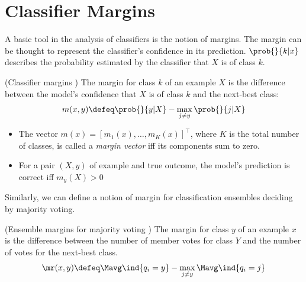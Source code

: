 \documentclass[
    a4paper, %
	fontsize=10pt, %
	twoside=false, %
]{kaobook}
\begin{document}
\section{Classifier Margins}

A basic tool in the analysis of classifiers is the notion of margins.  The margin can be thought to represent the classifier's confidence in its prediction. $\prob{}{k|x}$ describes the probability estimated by the classifier that $X$ is of class $k$.

\begin{definition} (Classifier margins \cite{tibshirani_ElementsStatisticalLearning_2017}) The margin for class $k$ of an example $X$ is the difference between the model's confidence that $X$ is of class $k$ and the next-best class:
$$
m(x,y) \defeq \prob{}{y|X} - \max_{j\not=y} \prob{}{j|X}
$$
\begin{itemize}
    \item The vector $m(x) = [m_{1}(x), \dots, m_{K}(x)]^\top$, where $K$ is the total number of classes, is called a \textit{margin vector} iff its components sum to zero. 
    \item For a pair $(X,y)$ of example and true outcome, the model's prediction is correct iff $m_y(X) > 0$ 
\end{itemize}
\label{def:classifier-margin}
\end{definition}

Similarly, we can define a notion of margin for classification ensembles deciding by majority voting. 

\begin{definition} (Ensemble margins for majority voting \cite{breiman})
The margin for class $y$ of an example $x$ is the difference between the number of member votes for class $Y$ and the number of votes for the next-best class.
	$$
\mr(x,y) \defeq \Mavg \ind{q_{i} = y} - \max_{j \neq y} \Mavg \ind{q_{i} = j}
$$
\label{def:ensemble-margin}
\end{definition}
\end{document}
